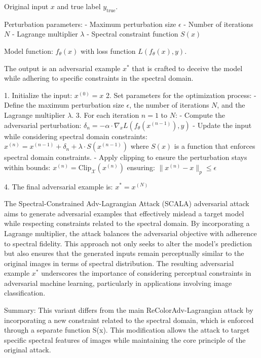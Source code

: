 Original input $x$ and true label $y_{\text{true}}$.

Perturbation parameters:
- Maximum perturbation size $\epsilon$
- Number of iterations $N$
- Lagrange multiplier $\lambda$
- Spectral constraint function $S(x)$

Model function: $f_{\theta}(x)$ with loss function $L(f_{\theta}(x), y)$.

The output is an adversarial example $x^*$ that is crafted to deceive the model while adhering to specific constraints in the spectral domain.

1. Initialize the input:
   $x^{(0)} = x$
2. Set parameters for the optimization process:
   - Define the maximum perturbation size $\epsilon$, the number of iterations $N$, and the Lagrange multiplier $\lambda$.
3. For each iteration $n = 1$ to $N$:
   - Compute the adversarial perturbation:
   $\delta_n = -\alpha \cdot \nabla_x L(f_{\theta}(x^{(n-1)}), y)$
   - Update the input while considering spectral domain constraints:
   $x^{(n)} = x^{(n-1)} + \delta_n + \lambda \cdot S(x^{(n-1)})$
   where $S(x)$ is a function that enforces spectral domain constraints.
   - Apply clipping to ensure the perturbation stays within bounds:
   $x^{(n)} = \text{Clip}_{\mathcal{X}}(x^{(n)})$
   ensuring:
   $\|x^{(n)} - x\|_p \leq \epsilon$

4. The final adversarial example is:
   $x^* = x^{(N)}$

The Spectral-Constrained Adv-Lagrangian Attack (SCALA) adversarial attack aims to generate adversarial examples that effectively mislead a target model while respecting constraints related to the spectral domain. By incorporating a Lagrange multiplier, the attack balances the adversarial objective with adherence to spectral fidelity. This approach not only seeks to alter the model's prediction but also ensures that the generated inputs remain perceptually similar to the original images in terms of spectral distribution. The resulting adversarial example $x^*$ underscores the importance of considering perceptual constraints in adversarial machine learning, particularly in applications involving image classification.

Summary: This variant differs from the main ReColorAdv-Lagrangian attack by incorporating a new constraint related to the spectral domain, which is enforced through a separate function S(x). This modification allows the attack to target specific spectral features of images while maintaining the core principle of the original attack.
